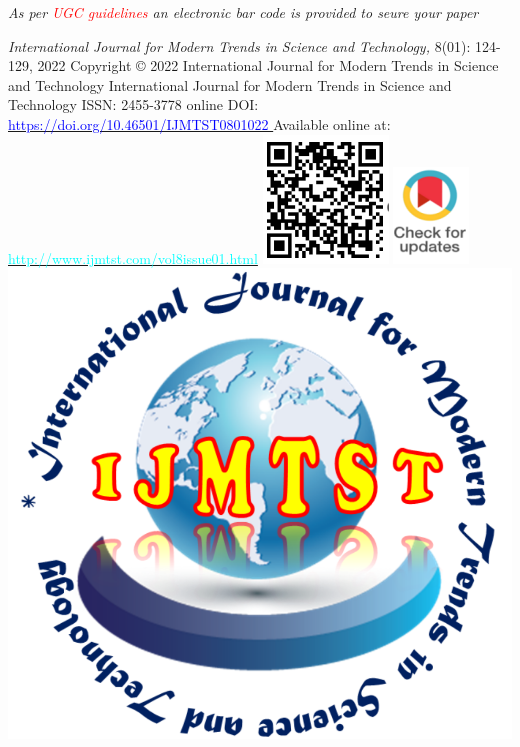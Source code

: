 \documentclass{letter}
\begin{document}
\begin{flushright}
\begin{scriptsize}
\textit{As per}
\textit{\textcolor{red}{UGC guidelines }}
\textit{an electronic bar code is provided to seure your paper}
\end{scriptsize}
\end{flushright}
\begin{multicols}{2}
\begin{flushleft}
\begin{scriptsize}
\textit{International Journal for Modern Trends in Science and Technology, }
 8(01): 124-129, 2022 Copyright © 2022 \newline International Journal for Modern Trends in Science and Technology International Journal for Modern Trends in Science and Technology  \newline ISSN: 2455-3778 online \newline DOI: \href{https://doi.org/10.46501/IJMTST0801022} {\textcolor{blue}{https://doi.org/10.46501/IJMTST0801022 }}\newline Available online at: \href { http://www.ijmtst.com/vol8issue01.html} {\textcolor{cyan}{ http://www.ijmtst.com/vol8issue01.html}}\newline \newline  
\includegraphics[width=.3\linewidth]{QR}\quad
\href{https://doi.org/10.46501/IJMTST0801022}{\includegraphics[width=.2\linewidth]{check}}\quad
\href{http://www.ijmtst.com/vol7issue11.html}{\includegraphics[width=.2\linewidth]{OI}}\quad
\end{scriptsize}
\end{flushleft}
\end{multicols}
\end{document}
